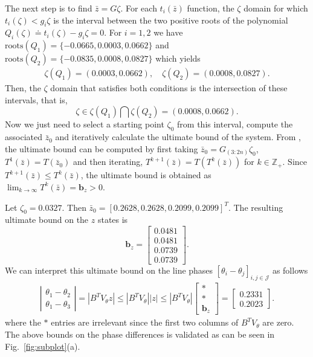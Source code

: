 \documentclass[letter, 10pt, conference]{ieeeconf}
\newcommand{\Z}{\mathbb{Z}}
\newcommand{\J}{\mathcal{J}}
\newcommand{\bnd}{\mathbf{b}}
\newcommand{\1}{\mathbf{1}}
\newcommand{\0}{\mathbf{0}}
\begin{document}
{The next step is to find $\bar{z}=G \zeta$. For each $t_i(\bar{z})$
function, the $\zeta$ domain for which $t_i(\zeta)<g_i \zeta$ is the
interval between the two positive roots of the polynomial $Q_i(\zeta)
\doteq t_i(\zeta)-g_i \zeta=0$.  For $i=1,2$ we have
$\mathrm{roots}(Q_1)=\{-0.0665,0.0003,0.0662\}$ and
$\mathrm{roots}(Q_2)=\{-0.0835,0.0008,0.0827\}$ which yields
\begin{align*}
	\zeta(Q_1)=(0.0003,0.0662), \quad
	\zeta(Q_2)=(0.0008,0.0827).
\end{align*}
Then, the $\zeta$ domain that satisfies both conditions is the
intersection of these intervals, that is,
\begin{equation}
	\label{ex:03}
	\zeta \in \zeta(Q_1) \bigcap \zeta(Q_2) = (0.0008,0.0662).
\end{equation}
Now we just need to select a starting point $\zeta_0$ from this
interval, compute the associated $\bar{z}_0$ and iteratively calculate
the ultimate bound of the system.  From \cite{HaS13}, the ultimate
bound can be computed by first taking $\bar{z}_0=G_{(3:2n)}\zeta_0$,
$T^1(\bar{z})=T(\bar{z}_0)$ and then iterating,
$T^{k+1}(\bar{z})=T(T^k(\bar{z}))$ for $k\in\Z_+$. Since
$T^{k+1}(\bar{z})\le T^k(\bar{z})$, the ultimate bound is obtained as
$\lim_{k \to \infty} T^k (\bar{z})=\bnd_z  >0$.

Let $\zeta_0=0.0327$.  Then
$\bar{z}_0=[0.2628,0.2628,0.2099,0.2099]^T$.  The resulting ultimate
bound on the $\hat{z}$ states is
\begin{equation}
	\label{ex:04}
	\bnd_z = \left[\begin{smallmatrix}
		0.0481 \\  0.0481 \\  0.0739 \\  0.0739
	\end{smallmatrix}\right].
\end{equation}
We can interpret this ultimate bound 
on the line phases $[\theta_i-\theta_j]_{i,j\in\J}$ 
as follows
\begin{align*}
	\left|\begin{smallmatrix}
		\theta_1-\theta_2 \\ \theta_1-\theta_3
	\end{smallmatrix}\right|
	=|B^T V_\theta z|
	\le 
	|B^T V_\theta| |z|
	\le 
	|B^T V_\theta| \left[\begin{smallmatrix}
		* \\ * \\ \bnd_z
	\end{smallmatrix}\right]=
	\left[\begin{smallmatrix}
		 0.2331 \\ 0.2023
	\end{smallmatrix}\right].
\end{align*}
where the $*$ entries are irrelevant since the first two columns
of $B^T V_\theta$ are zero.
The above bounds on the phase differences is validated as can be seen in
Fig.~\ref{fig:subplot}(a).

}
\end{document}
